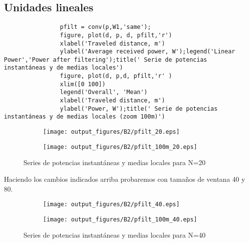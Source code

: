 \documentclass{article}
\begin{document}
            \subsection{Unidades lineales}
            \begin{lstlisting}
                pfilt = conv(p,W1,'same');
                figure, plot(d, p, d, pfilt,'r')
                xlabel('Traveled distance, m')
                ylabel('Average received power, W');legend('Linear Power','Power after filtering');title(' Serie de potencias instantáneas y de medias locales')
                figure, plot(d, p,d, pfilt,'r' )
                xlim([0 100])
                legend('Overall', 'Mean')
                xlabel('Traveled distance, m')
                ylabel('Power, W');title(' Serie de potencias instantáneas y de medias locales (zoom 100m)')
            \end{lstlisting}
         \begin{figure}[h]
                \centering
                \begin{subfigure}
                    \centering          \texttt{[image: output\_figures/B2/pfilt\_20.eps]}
               \end{subfigure}
               \begin{subfigure}
                    \centering          \texttt{[image: output\_figures/B2/pfilt\_100m\_20.eps]}
               \end{subfigure}    
               \caption{Series de potencias instantáneas y medias locales para N=20}
                \label{fig:sup_rugosas}
            \end{figure}
            \par Haciendo los cambios indicados arriba probaremos con tamaños de ventana 40 y 80.
            \begin{figure}[h]
                \centering
                \begin{subfigure}
                    \centering          \texttt{[image: output\_figures/B2/pfilt\_40.eps]}
               \end{subfigure}
               \begin{subfigure}
                    \centering          \texttt{[image: output\_figures/B2/pfilt\_100m\_40.eps]}
               \end{subfigure}    
               \caption{Series de potencias instantáneas y medias locales para N=40}
                \label{fig:sup_rugosas}
            \end{figure}
          
\end{document}
